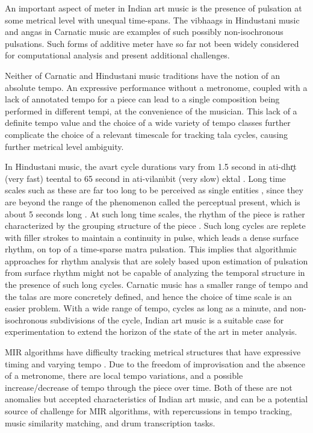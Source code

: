 An important aspect of meter in Indian art music is the presence of pulsation at some metrical level with unequal time-spans. The \glspl{vibhaag} in Hindustani music and \glspl{anga} in Carnatic music are examples of such possibly non-isochronous pulsations. Such forms of additive meter have so far not been widely considered for computational analysis and present additional challenges. 

Neither of Carnatic and Hindustani music traditions have the notion of an absolute tempo. An expressive performance without a metronome, coupled with a lack of annotated tempo for a piece can lead to a single composition being performed in different tempi, at the convenience of the musician. This lack of a definite tempo value and the choice of a wide variety of tempo classes further complicate the choice of a relevant timescale for tracking \gls{tala} cycles, causing further metrical level ambiguity. 

In Hindustani music, the \gls{avart} cycle durations vary from 1.5 second in ati-dhr̥t (very fast) \gls{teental} to 65 second in ati-vilaṁbit (very slow) \gls{ektal} \cite[p.~87]{clayton:00:time}. Long time scales such as these are far too long to be perceived as single entities \cite{clayton:00:time}, since they are beyond the range of the phenomenon called the perceptual present, which is about 5 seconds long \cite{clarke:99:percpresent}. At such long time scales, the rhythm of the piece is rather characterized by the grouping structure of the piece \cite{lerdahl:83:generative}. Such long cycles are replete with filler strokes to maintain a continuity in pulse, which leads a dense surface rhythm, on top of a time-sparse \gls{matra} pulsation. This implies that algorithmic approaches for rhythm analysis that are solely based upon estimation of pulsation from surface rhythm might not be capable of analyzing the temporal structure in the presence of such long cycles. Carnatic music has a smaller range of tempo and the \glspl{tala} are more concretely defined, and hence the choice of time scale is an easier problem. With a wide range of tempo, cycles as long as a minute, and non-isochronous subdivisions of the cycle, Indian art music is a suitable case for experimentation to extend the horizon of the state of the art in meter analysis. 

\gls{MIR} algorithms have difficulty tracking metrical structures that have expressive timing and varying tempo \cite{holzapfel:12:beat}. Due to the freedom of improvisation and the absence of a metronome, there are local tempo variations, and a possible increase/decrease of tempo through the piece over time. Both of these are not anomalies but accepted characteristics of Indian art music, and can be a potential source of challenge for \gls{MIR} algorithms, with repercussions in tempo tracking, music similarity matching, and drum transcription tasks. 

